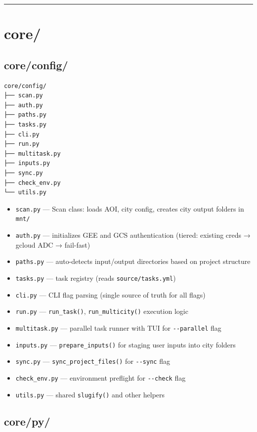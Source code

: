 \documentclass[
  letterpaper,
  DIV=11,
  numbers=noendperiod]{scrreprt}
\providecommand{\tightlist}{%
  \setlength{\itemsep}{0pt}\setlength{\parskip}{0pt}}
\begin{document}
\begin{center}\rule{0.5\linewidth}{0.5pt}\end{center}

\section{core/}\label{core}

\subsection{core/config/}\label{coreconfig}

\begin{verbatim}
core/config/
├── scan.py
├── auth.py
├── paths.py
├── tasks.py
├── cli.py
├── run.py
├── multitask.py
├── inputs.py
├── sync.py
├── check_env.py
└── utils.py
\end{verbatim}

\begin{itemize}
\tightlist
\item
  \texttt{scan.py} --- Scan class: loads AOI, city config, creates city
  output folders in \texttt{mnt/}
\item
  \texttt{auth.py} --- initializes GEE and GCS authentication (tiered:
  existing creds → gcloud ADC → fail-fast)
\item
  \texttt{paths.py} --- auto-detects input/output directories based on
  project structure
\item
  \texttt{tasks.py} --- task registry (reads \texttt{source/tasks.yml})
\item
  \texttt{cli.py} --- CLI flag parsing (single source of truth for all
  flags)
\item
  \texttt{run.py} --- \texttt{run\_task()}, \texttt{run\_multicity()}
  execution logic
\item
  \texttt{multitask.py} --- parallel task runner with TUI for
  \texttt{-\/-parallel} flag
\item
  \texttt{inputs.py} --- \texttt{prepare\_inputs()} for staging user
  inputs into city folders
\item
  \texttt{sync.py} --- \texttt{sync\_project\_files()} for
  \texttt{-\/-sync} flag
\item
  \texttt{check\_env.py} --- environment preflight for
  \texttt{-\/-check} flag
\item
  \texttt{utils.py} --- shared \texttt{slugify()} and other helpers
\end{itemize}

\subsection{core/py/}\label{corepy}
\end{document}
